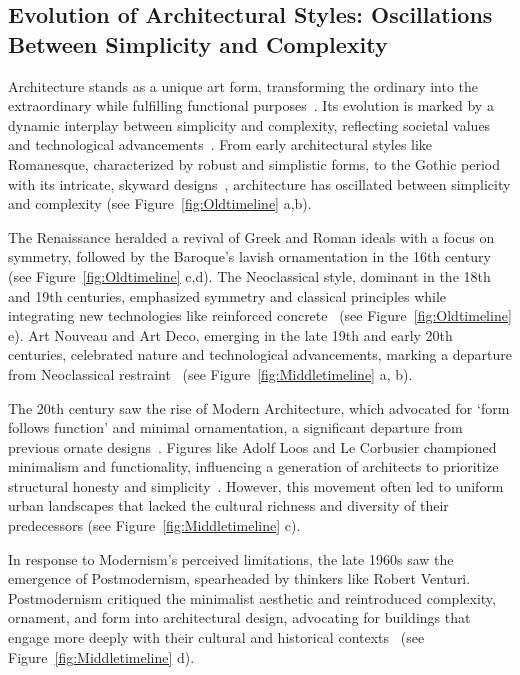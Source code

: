 \subsection{Evolution of Architectural Styles: Oscillations Between Simplicity and Complexity}
\label{subsec:TimelineArchitectureStyles}

Architecture stands as a unique art form, transforming the ordinary into the extraordinary while fulfilling functional purposes~\cite{Hnin2022}.
Its evolution is marked by a dynamic interplay between simplicity and complexity, reflecting societal values and technological advancements~\cite{Economakis2023}.
From early architectural styles like Romanesque, characterized by robust and simplistic forms, to the Gothic period with its intricate, skyward designs~\cite{Stacbond2020}, architecture has oscillated between simplicity and complexity (see Figure~\ref{fig:Oldtimeline} a,b).

The Renaissance heralded a revival of Greek and Roman ideals with a focus on symmetry, followed by the Baroque's lavish ornamentation in the 16th century~\cite{Economakis2023} (see Figure~\ref{fig:Oldtimeline} c,d).
The Neoclassical style, dominant in the 18th and 19th centuries, emphasized symmetry and classical principles while integrating new technologies like reinforced concrete~\cite{Economakis2023} (see Figure~\ref{fig:Oldtimeline} e).
Art Nouveau and Art Deco, emerging in the late 19th and early 20th centuries, celebrated nature and technological advancements, marking a departure from Neoclassical restraint~\cite{Salas2018, Arora2023} (see Figure~\ref{fig:Middletimeline} a, b).

The 20th century saw the rise of Modern Architecture, which advocated for `form follows function' and minimal ornamentation, a significant departure from previous ornate designs~\cite{Gage2015}.
Figures like Adolf Loos and Le Corbusier championed minimalism and functionality, influencing a generation of architects to prioritize structural honesty and simplicity~\cite{Saglam2014}.
However, this movement often led to uniform urban landscapes that lacked the cultural richness and diversity of their predecessors (see Figure~\ref{fig:Middletimeline} c).

In response to Modernism's perceived limitations, the late 1960s saw the emergence of Postmodernism, spearheaded by thinkers like Robert Venturi.
Postmodernism critiqued the minimalist aesthetic and reintroduced complexity, ornament, and form into architectural design, advocating for buildings that engage more deeply with their cultural and historical contexts~\cite{Venturi1972} (see Figure~\ref{fig:Middletimeline} d).

